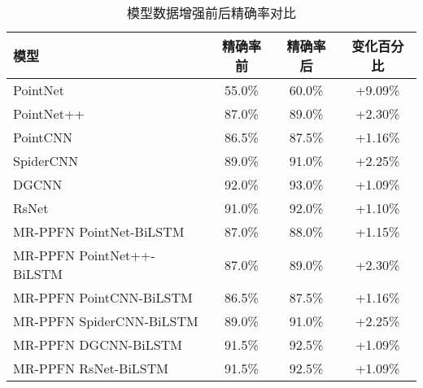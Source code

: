 \begin{table}[htbp]
    \begin{subtable}{\linewidth}
        \centering
        \caption{模型数据增强前后精确率对比}
        \begin{tabular}{lc|cc}
            \toprule
            \textbf{模型} & \textbf{精确率前} & \textbf{精确率后} & \textbf{变化百分比} \\
            \midrule
            PointNet & 55.0\% & 60.0\% & +9.09\% \\
            PointNet++ & 87.0\% & 89.0\% & +2.30\% \\
            PointCNN & 86.5\% & 87.5\% & +1.16\% \\
            SpiderCNN & 89.0\% & 91.0\% & +2.25\% \\
            DGCNN & 92.0\% & 93.0\% & +1.09\% \\
            RsNet & 91.0\% & 92.0\% & +1.10\% \\
            MR-PPFN PointNet-BiLSTM & 87.0\% & 88.0\% & +1.15\% \\
            MR-PPFN PointNet++-BiLSTM & 87.0\% & 89.0\% & +2.30\% \\
            MR-PPFN PointCNN-BiLSTM & 86.5\% & 87.5\% & +1.16\% \\
            MR-PPFN SpiderCNN-BiLSTM & 89.0\% & 91.0\% & +2.25\% \\
            MR-PPFN DGCNN-BiLSTM & 91.5\% & 92.5\% & +1.09\% \\
            MR-PPFN RsNet-BiLSTM & 91.5\% & 92.5\% & +1.09\% \\
            \bottomrule
        \end{tabular}
        \label{tab:precision-comparison}
    \end{subtable}
\end{table}

